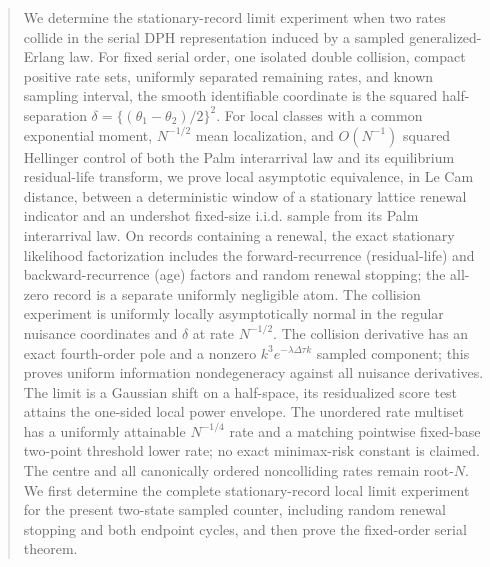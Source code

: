 \begin{abstract}
We determine the stationary-record limit experiment when two rates collide in
the serial DPH representation induced by a sampled generalized-Erlang law.
For fixed serial order, one isolated double collision, compact
positive rate sets, uniformly separated remaining rates, and known sampling
interval, the smooth identifiable coordinate is the squared half-separation
\(\delta=\{(\theta_1-\theta_2)/2\}^2\).  For local classes with a common
exponential moment, \(N^{-1/2}\) mean localization, and \(O(N^{-1})\) squared
Hellinger control of both the Palm interarrival law and its equilibrium
residual-life transform, we prove local asymptotic equivalence, in Le Cam
distance, between a deterministic window of a stationary lattice renewal
indicator and an undershot fixed-size i.i.d. sample from its Palm interarrival
law.  On records containing a renewal, the
exact stationary likelihood factorization includes the forward-recurrence
(residual-life) and backward-recurrence (age) factors and random renewal
stopping; the all-zero record is a separate uniformly negligible atom.  The
collision experiment is uniformly locally asymptotically normal in the regular nuisance
coordinates and \(\delta\) at rate \(N^{-1/2}\).  The collision derivative has
an exact fourth-order pole and a nonzero
\(k^3e^{-\lambda\Delta\tau k}\) sampled component; this proves uniform
information nondegeneracy against all nuisance derivatives.  The limit is a
Gaussian shift on a half-space, its residualized score test attains the
one-sided local power envelope.  The unordered rate multiset has a uniformly
attainable \(N^{-1/4}\) rate and a matching pointwise fixed-base two-point
threshold lower rate; no exact minimax-risk constant is claimed.  The centre
and all canonically ordered noncolliding rates remain root-\(N\).  We first
determine the complete stationary-record local limit experiment for the present
two-state sampled counter, including random renewal stopping and both endpoint
cycles, and then prove the fixed-order serial theorem.


\end{abstract}
